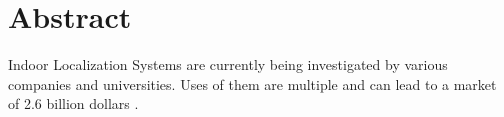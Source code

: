\chapter{Abstract}

Indoor Localization Systems are currently being investigated by various companies and universities.
Uses of them are multiple and can lead to a market of 2.6 billion dollars \cite{market}.

